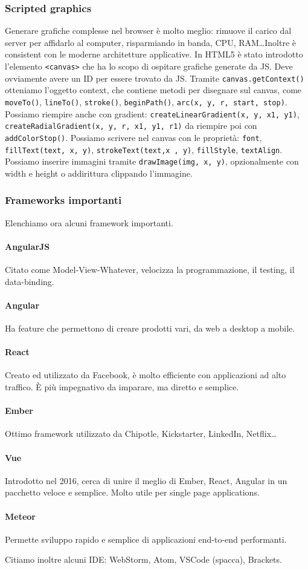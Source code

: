 \documentclass[11pt]{article}
\newcommand{\code}[1]{\texttt{#1}}
\begin{document}
\subsubsection{Scripted graphics}
Generare grafiche complesse nel browser è molto meglio: rimuove il carico dal server per affidarlo al computer, risparmiando in banda, CPU, RAM\dots Inoltre è consistent con le moderne architetture applicative. In HTML5 è stato introdotto l'elemento \code{<canvas>} che ha lo scopo di ospitare grafiche generate da JS. Deve ovviamente avere un ID per essere trovato da JS. Tramite \code{canvas.getContext()} otteniamo l'oggetto context, che contiene metodi per disegnare sul canvas, come \code{moveTo()}, \code{lineTo()}, \code{stroke()}, \code{beginPath()}, \code{arc(x, y, r, start, stop)}. Possiamo riempire anche con gradient: \code{createLinearGradient(x, y, x1, y1)}, \code{createRadialGradient(x, y, r, x1, y1, r1)} da riempire poi con \code{addColorStop()}. Possiamo scrivere nel canvas con le proprietà: \code{font}, \code{fillText(text, x, y)}, \code{strokeText(text,x , y)}, \code{fillStyle}, \code{textAlign}. Possiamo inserire immagini tramite \code{drawImage(img, x, y)}, opzionalmente con width e height o addirittura clippando l'immagine. 
\subsubsection{Frameworks importanti}
Elenchiamo ora alcuni framework importanti.
\paragraph{AngularJS} Citato come Model-View-Whatever, velocizza la programmazione, il testing, il data-binding.
\paragraph{Angular} Ha feature che permettono di creare prodotti vari, da web a desktop a mobile.
\paragraph{React} Creato ed utilizzato da Facebook, è molto efficiente con applicazioni ad alto traffico. È più impegnativo da imparare, ma diretto e semplice. 
\paragraph{Ember} Ottimo framework utilizzato da Chipotle, Kickstarter, LinkedIn, Netflix\dots
\paragraph{Vue} Introdotto nel 2016, cerca di unire il meglio di Ember, React, Angular in un pacchetto veloce e semplice. Molto utile per single page applications. 
\paragraph{Meteor} Permette sviluppo rapido e semplice di applicazioni end-to-end performanti. 

Citiamo inoltre alcuni IDE: WebStorm, Atom, VSCode (spacca), Brackets.
\end{document}
